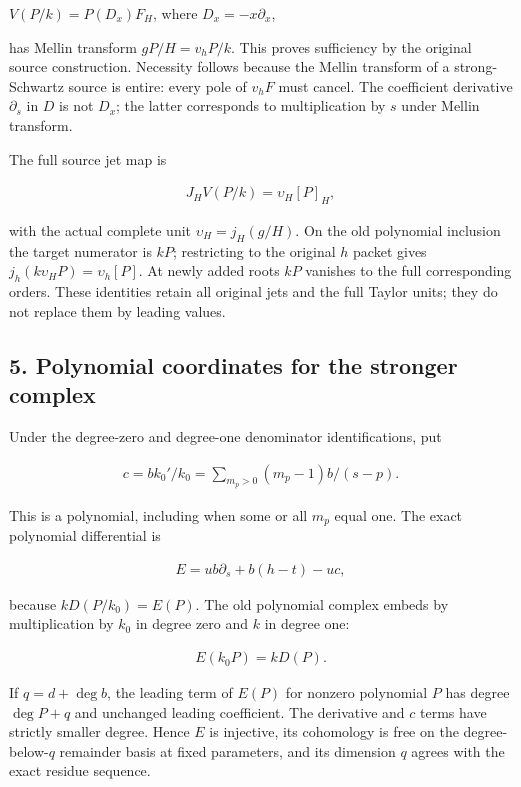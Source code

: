 \(V(P/k)=P(D_x)F_H\), where \(D_x=-x\partial_x\),


has Mellin transform \(gP/H=v_hP/k\). This proves sufficiency by the
original source construction. Necessity follows because the Mellin
transform of a strong-Schwartz source is entire: every pole of \(v_hF\)
must cancel. The coefficient derivative \(\partial_s\) in \(D\) is not \(D_x\);
the latter corresponds to multiplication by \(s\) under Mellin transform.


The full source jet map is


\[
\begin{gathered}
J_HV(P/k)=\upsilon_H[P]_H,
\end{gathered}
\]


with the actual complete unit \(\upsilon_H=j_H(g/H)\). On the old polynomial
inclusion the target numerator is \(kP\); restricting to the original \(h\) packet
gives \(j_h(k\upsilon_HP)=\upsilon_h[P]\). At newly added roots \(kP\) vanishes
to the full corresponding orders. These identities retain all original
jets and the full Taylor units; they do not replace them by leading values.


\subsection*{5. Polynomial coordinates for the stronger complex}


Under the degree-zero and degree-one denominator identifications, put


\[
\begin{gathered}
c=bk_0'/k_0=\sum_{m_p>0}(m_p-1)b/(s-p).
\end{gathered}
\]


This is a polynomial, including when some or all \(m_p\) equal one. The
exact polynomial differential is


\[
\begin{gathered}
E=ub\partial_s+b(h-t)-uc,
\end{gathered}
\]


because \(kD(P/k_0)=E(P)\). The old polynomial complex embeds by
multiplication by \(k_0\) in degree zero and \(k\) in degree one:


\[
\begin{gathered}
E(k_0P)=kD(P).
\end{gathered}
\]


If \(q=d+\deg b\), the leading term of \(E(P)\) for nonzero polynomial \(P\)
has degree \(\deg P+q\) and unchanged leading coefficient. The derivative
and \(c\) terms have strictly smaller degree. Hence \(E\) is injective, its
cohomology is free on the degree-below-\(q\) remainder basis at fixed
parameters, and its dimension \(q\) agrees with the exact residue sequence.


